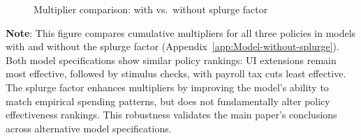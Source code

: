 \documentclass[\latexroot/\projectname]{subfiles}
\begin{document}
\begin{figure}[H]
  \centering
  \caption{\pregenmark Multiplier comparison: with vs.\ without splurge factor}
  \whenintegrated{\label{fig:cumulativemultipliers_SplurgeComp}} %
\end{figure}
\noindent\parbox{\textwidth}{\footnotesize
  \textbf{Note}: This figure compares cumulative multipliers for all three policies
  in models with and without the splurge factor (Appendix~\ref{app:Model-without-splurge}).
  Both model specifications show similar policy rankings: UI extensions remain most effective,
  followed by stimulus checks, with payroll tax cuts least effective.
  The splurge factor enhances multipliers by improving the model's ability to match
  empirical spending patterns, but does not fundamentally alter policy effectiveness rankings.
  This robustness validates the main paper's conclusions across alternative model specifications.
}

\vspace{1em}  %

\smartbib
\end{document}
